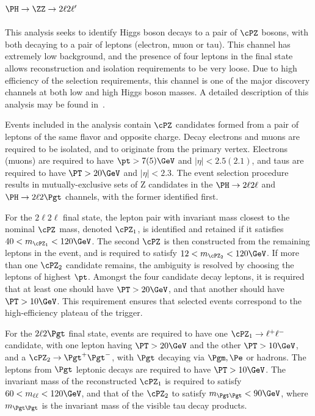 
\subsection{$\PH \to \ZZ \to 2\ell 2\ell '$}

This analysis seeks to identify Higgs boson decays to a pair of $\cPZ$ bosons, with both decaying to a pair of
leptons (electron, muon or tau). This channel has extremely low background, and the presence of four leptons in the
final state allows reconstruction and isolation requirements to be very loose. Due to high efficiency of the 
selection requirements, this channel is one of the major discovery channels at both low and high Higgs boson masses.
A detailed description of this analysis may be found in~\cite{CMSobservation125,Chatrchyan:2012dg,Chatrchyan:2012hr}.

Events included in the analysis contain $\cPZ$ candidates formed from a pair of leptons of the same flavor and
opposite charge. Decay electrons and muons are required to be isolated, and to originate from the primary vertex.
Electrons (muons) are required to have $\pt > 7(5)\GeV$ and $|\eta|<2.5(2.1)$, and taus are required to have
$\PT > 20 \GeV$ and $|\eta|<2.3$. The event selection procedure results in mutually-exclusive sets of Z candidates
in the $\PH\rightarrow 2\ell 2\ell$ and $\PH\rightarrow 2\ell2\Pgt$ channels, with the former identified first.

For the $2\ell2\ell$ final state, the lepton pair with invariant mass closest to the nominal $\cPZ$ mass, denoted
$\cPZ_1$, is identified and retained if it satisfies $40 < m_{\cPZ_1} < 120\GeV$. The second $\cPZ$ is then
constructed from the remaining leptons in the event, and is required to satisfy $12 < m_{\cPZ_2} < 120\GeV$. If
more than one $\cPZ_2$ candidate remains, the ambiguity is resolved by choosing the leptons of highest $\pt$. Amongst
the four candidate decay leptons, it is required that at least one should have $\PT > 20\GeV$, and that another
should have $\PT > 10\GeV$. This requirement ensures that selected events correspond to the high-efficiency
plateau of the trigger.


For the $2\ell2\Pgt$ final state, events are required to have one $\cPZ_1 \to \ell^+\ell^-$ candidate, with one
lepton having $\PT > 20\GeV$ and the other $\PT > 10\GeV$, and a $\cPZ_2 \to \Pgt^+\Pgt^-$, with $\Pgt$ decaying
via $\Pgm, \Pe$ or hadrons. The leptons from $\Pgt$ leptonic decays are required to have $\PT > 10\GeV$. The invariant
mass of the reconstructed $\cPZ_1$ is required to satisfy $60 < m_{\ell\ell} < 120\GeV$, and that of the $\cPZ_2$ to
satisfy $ m_{\Pgt\Pgt} < 90\GeV$, where $m_{\Pgt\Pgt}$ is the invariant mass of the visible tau decay products.

